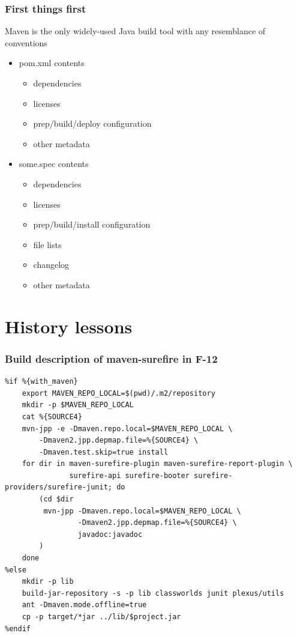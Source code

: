 \documentclass[pdftex,unicode,xcolor=table]{beamer}
\begin{document}
\begin{frame}
  \frametitle{First things first}
Maven is the only widely-used Java build tool with any resemblance of
      conventions
  \begin{itemize}
  \item pom.xml contents
    \begin{itemize}
    \item dependencies
    \item licenses
    \item prep/build/deploy configuration
    \item other metadata
    \end{itemize}
  \item some.spec contents
    \begin{itemize}
    \item dependencies
    \item licenses
    \item prep/build/install configuration
    \item file lists
    \item changelog
    \item other metadata
    \end{itemize}
  \end{itemize}
\end{frame}

\section{History lessons}
\begin{frame}[fragile]
  \frametitle{Build description of maven-surefire in F-12}
  \scriptsize
  \begin{verbatim}
%if %{with_maven}
    export MAVEN_REPO_LOCAL=$(pwd)/.m2/repository
    mkdir -p $MAVEN_REPO_LOCAL
    cat %{SOURCE4}
    mvn-jpp -e -Dmaven.repo.local=$MAVEN_REPO_LOCAL \
        -Dmaven2.jpp.depmap.file=%{SOURCE4} \
        -Dmaven.test.skip=true install
    for dir in maven-surefire-plugin maven-surefire-report-plugin \
               surefire-api surefire-booter surefire-providers/surefire-junit; do
        (cd $dir
         mvn-jpp -Dmaven.repo.local=$MAVEN_REPO_LOCAL \
                 -Dmaven2.jpp.depmap.file=%{SOURCE4} \
                 javadoc:javadoc
        )
    done
%else
    mkdir -p lib
    build-jar-repository -s -p lib classworlds junit plexus/utils
    ant -Dmaven.mode.offline=true
    cp -p target/*jar ../lib/$project.jar
%endif
  \end{verbatim}
  \note{Note!}
\end{frame}
\end{document}
